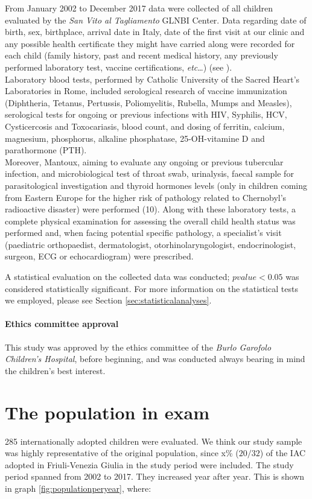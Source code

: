 From  January 2002 to  December 2017 data were collected of all children evaluated by the \textit{San Vito al Tagliamento} GLNBI Center. Data regarding date of birth, sex, birthplace, arrival date in Italy, date of the first visit at our clinic and any possible health certificate they might have carried along were recorded for each child (family history, past and recent medical history, any previously performed laboratory test, vaccine certifications, \textit{etc}\dots) (see \cite{redbook}).\\
Laboratory blood tests, performed by Catholic University of the Sacred Heart’s Laboratories in Rome, included serological research of vaccine immunization (Diphtheria, Tetanus, Pertussis, Poliomyelitis, Rubella, Mumps and Measles), serological tests for ongoing or previous infections with HIV, Syphilis, HCV, Cysticercosis and Toxocariasis, blood count, and dosing of ferritin, calcium, magnesium, phosphorus, alkaline phosphatase, 25-OH-vitamine D and parathormone (PTH).\\
Moreover, Mantoux, aiming to evaluate any ongoing or previous tubercular infection, and microbiological test of throat swab, urinalysis, faecal sample for parasitological investigation and thyroid hormones levels (only in children coming from Eastern Europe for the higher risk of pathology related to Chernobyl’s radioactive disaster) were performed (10).
Along with these laboratory tests, a complete physical examination for assessing the overall child health status was performed and, when facing potential specific pathology, a specialist’s visit (paediatric orthopaedist, dermatologist, otorhinolaryngologist, endocrinologist, surgeon, ECG or echocardiogram) were prescribed.

A statistical evaluation on the collected data was conducted; $p value < 0.05$ was considered statistically significant. For more information on the statistical tests we employed, please see Section \ref{sec:statisticalanalyses}.

\paragraph*{Ethics committee approval} This study was approved by the ethics committee of the \textit{Burlo Garofolo Children's Hospital}, before beginning, and was conducted always bearing in mind the children's best interest. 


\section{The population in exam}\label{sec:thepopulationinexam}
285 internationally adopted children were evaluated. We think our study sample was highly representative of the original population, since x\% ($20/32$) of the IAC adopted in Friuli-Venezia Giulia in the study period were included.
The study period spanned from 2002 to 2017. They increased year after year. This is shown in graph \ref{fig:populationperyear}, where:

